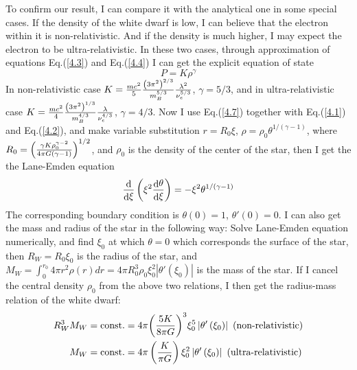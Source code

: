 \documentclass[preprint]{revtex4-1}
\begin{document}
To confirm our result, I can compare it with the analytical one in some special cases. If the density of the white dwarf is low, I can believe that the electron within it is non-relativistic. And if the density is much higher, I may expect the electron to be ultra-relativistic. In these two cases, through approximation of equations Eq.(\ref{4.3}) and Eq.(\ref{4.4})  I can get the explicit equation of state
\begin{equation}
P = K{\rho ^\gamma } \label{4.7}
\end{equation}
In non-relativistic case $K = {{m{c^2}} \over 5}{{{{\left( {3{\pi ^2}} \right)}^{2/3}}} \over {m_B^{5/3}}}{{{\lambda ^2}} \over {\nu _e^{5/3}}}$, $\gamma  = 5/3$, and in ultra-relativistic case $K = {{m{c^2}} \over 4}{{{{\left( {3{\pi ^2}} \right)}^{1/3}}} \over {m_B^{4/3}}}{\lambda  \over {\nu _e^{4/3}}}$, $\gamma  = 4/3$. Now I use Eq.(\ref{4.7}) together with Eq.(\ref{4.1}) and Eq.(\ref{4.2}), and make variable substitution $r = {R_0}\xi $, $\rho  = {\rho _0}{\theta ^{1/\left( {\gamma  - 1} \right)}}$, where ${R_0} = {\left( {{{\gamma K\rho _0^{\gamma  - 2}} \over {4\pi G(\gamma  - 1)}}} \right)^{1/2}}$, and ${\rho _0}$ is the density of the center of the star, then I get the the Lane-Emden equation
\begin{equation}
{{\mathop{\rm d}\nolimits}  \over {{\mathop{\rm d}\nolimits} \xi }}\left( {{\xi ^2}{{{\mathop{\rm d}\nolimits} \theta } \over {{\mathop{\rm d}\nolimits} \xi }}} \right) =  - {\xi ^2}{\theta ^{1/\left( {\gamma  - 1} \right)}} \label{4.8}
\end{equation}
The corresponding boundary condition is $\theta \left( 0 \right) = 1$, $\theta '\left( 0 \right) = 0$. I can also get the mass and radius of the star in the following way: Solve Lane-Emden equation numerically, and find ${\xi _0}$ at which $\theta  = 0$ which corresponds the surface of the star, then ${R_W} = {R_0}{\xi _0}$  is the radius of the star, and ${M_W} = \int_0^{{r_0}} {4\pi {r^2}\rho \left( r \right)} dr = 4\pi R_0^3{\rho _0}\xi _0^2\left| {\theta '\left( {{\xi _0}} \right)} \right|$ is the mass of the star. If I cancel the central density ${\rho _0}$ from the above two relations, I then get the radius-mass relation of the white dwarf: 
\begin{align}
R_W^3{M_W} &= {\mathop{\rm const}\nolimits} . = 4\pi {\left( {{{5K} \over {8\pi G}}} \right)^3}\xi _0^5\left| {\theta '\left( {{\xi _0}} \right)} \right| \text{   (non-relativistic)} \nonumber \\
{M_W} &= {\mathop{\rm const}\nolimits} . = 4\pi \left( {{K \over {\pi G}}} \right)\xi _0^2\left| {\theta '\left( {{\xi _0}} \right)} \right| \text{   (ultra-relativistic)} \label{4.9}
\end{align}
\end{document}
